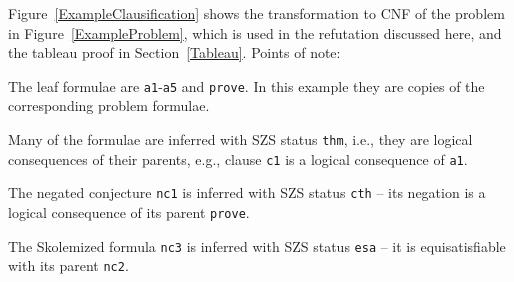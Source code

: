 \documentclass{ceurart}
\newcommand{\smalltt}[1]{\small \texttt{#1}}
\newenvironment{packed_itemize}{
\vspace*{-0.3em}
\begin{itemize}
\setlength{\partopsep}{0pt}
\setlength{\itemsep}{1pt}
\setlength{\parskip}{0pt}
\setlength{\parsep}{0pt}
}{\end{itemize}}
\begin{document}
Figure~\ref{ExampleClausification} shows the transformation to CNF of the problem in 
Figure~\ref{ExampleProblem}, which is used in the refutation discussed here, and the tableau
proof in Section~\ref{Tableau}.
Points of note:
\begin{packed_itemize}
\item The leaf formulae are \smalltt{a1}-\smalltt{a5} and \smalltt{prove}.
      In this example they are copies of the corresponding problem formulae.
\item Many of the formulae are inferred with SZS status \smalltt{thm}, i.e., they are logical 
      consequences of their parents, e.g., clause \smalltt{c1} is a logical consequence of 
      \smalltt{a1}.
\item The negated conjecture \smalltt{nc1} is inferred with SZS status \smalltt{cth} --
      its negation is a logical consequence of its parent \smalltt{prove}.
\item The Skolemized formula \smalltt{nc3} is inferred with SZS status \smalltt{esa} --
      it is equisatisfiable with its parent \smalltt{nc2}.
\end{packed_itemize}
\end{document}
